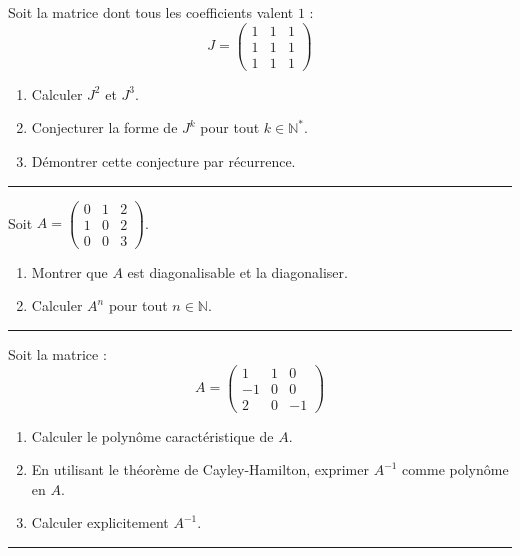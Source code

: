 \documentclass[../PolyS4.tex]{subfiles}
\begin{document}
Soit la matrice dont tous les coefficients valent $1$ :
$$J = \begin{pmatrix}
1 & 1 & 1 \\
1 & 1 & 1 \\
1 & 1 & 1
\end{pmatrix}$$
\begin{enumerate}
    \item Calculer $J^2$ et $J^3$.
    \item Conjecturer la forme de $J^k$ pour tout $k \in \mathbb{N}^*$.
    \item Démontrer cette conjecture par récurrence.
\end{enumerate}

\vspace{1em}
\hrule
\vspace{1em}


Soit $A = \begin{pmatrix}
0 & 1 & 2 \\
1 & 0 & 2 \\
0 & 0 & 3
\end{pmatrix}$.
\begin{enumerate}
    \item Montrer que $A$ est diagonalisable et la diagonaliser.
    \item Calculer $A^n$ pour tout $n \in \mathbb{N}$.
\end{enumerate}

\vspace{1em}
\hrule
\vspace{1em}


Soit la matrice :
$$A = \begin{pmatrix}
1 & 1 & 0 \\
-1 & 0 & 0 \\
2 & 0 & -1
\end{pmatrix}$$
\begin{enumerate}
    \item Calculer le polynôme caractéristique de $A$.
    \item En utilisant le théorème de Cayley-Hamilton, exprimer $A^{-1}$ comme polynôme en $A$.
    \item Calculer explicitement $A^{-1}$.
\end{enumerate}

\vspace{1em}
\hrule
\vspace{1em}
\end{document}
